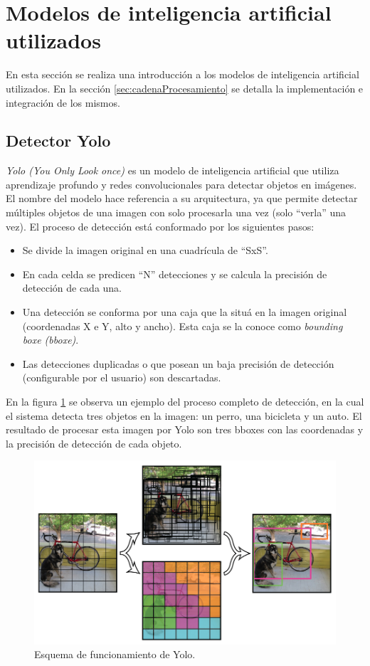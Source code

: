 \section{Modelos de inteligencia artificial utilizados}
\label{sec:modelosIA}

En esta sección se realiza una introducción a los modelos de inteligencia artificial utilizados. En la sección \ref{sec:cadenaProcesamiento} se detalla la implementación e integración de los mismos.

\subsection{Detector Yolo}

\textit{Yolo (You Only Look once)} es un modelo de inteligencia artificial que utiliza aprendizaje profundo y redes convolucionales para detectar objetos en imágenes. El nombre del modelo hace referencia a su arquitectura, ya que permite detectar múltiples objetos de una imagen con solo procesarla una vez (solo ``verla'' una vez). El proceso de detección está conformado por los siguientes pasos:

\begin{itemize}
\item Se divide la imagen original en una cuadrícula de ``SxS''.
\item En cada celda se predicen ``N'' detecciones y se calcula la precisión de detección de cada una.
\item Una detección se conforma por una caja que la situá en la imagen original (coordenadas X e Y, alto y ancho). Esta caja se la conoce como \textit{bounding boxe (bboxe)}.
\item Las detecciones duplicadas o que posean un baja precisión de detección (configurable por el usuario) son descartadas.
\end{itemize}

En la figura \ref{fig:diagramaYolo} se observa un ejemplo del proceso completo de detección, en la cual el sistema detecta tres objetos en la imagen: un perro, una bicicleta y un auto. El resultado de procesar esta imagen por Yolo son tres bboxes con las coordenadas y la precisión de detección de cada objeto.

\begin{figure}[ht]
	\centering
	\includegraphics[scale=.60]{./Figures/yolo.png}
	\caption{Esquema de funcionamiento de Yolo\protect\footnotemark.}
	\label{fig:diagramaYolo}
\end{figure}

